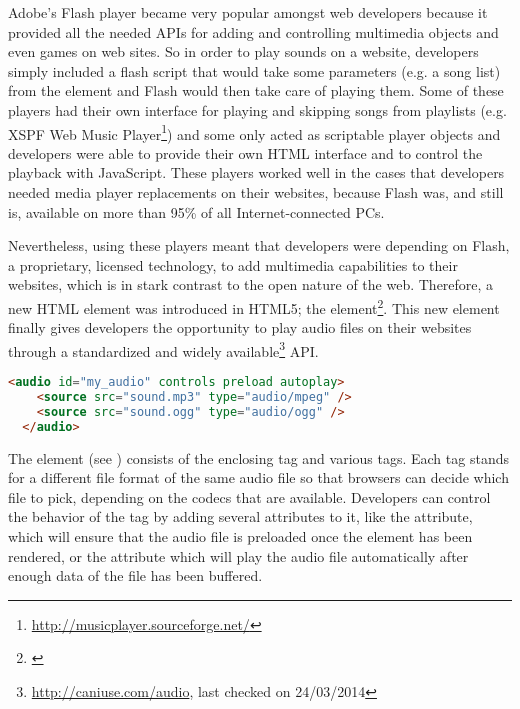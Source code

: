 Adobe's Flash player became very popular amongst web developers because it provided all the needed APIs for adding and controlling multimedia objects and even games on web sites. So in order to play sounds on a website, developers simply included a flash script that would take some parameters (e.g. a song list) from the  element and Flash would then take care of playing them. Some of these players had their own interface for playing and skipping songs from playlists (e.g. XSPF Web Music Player\footnote{\url{http://musicplayer.sourceforge.net/}}) and some only acted as scriptable player objects and developers were able to provide their own HTML interface and to control the playback with JavaScript. These players worked well in the cases that developers needed media player replacements on their websites, because Flash was, and still is, available on more than 95\% of all Internet-connected PCs. \cite{arah200999percent}

Nevertheless, using these players meant that developers were depending on Flash, a proprietary, licensed technology, to add multimedia capabilities to their websites, which is in stark contrast to the open nature of the web. Therefore, a new HTML element was introduced in HTML5; the  element\footnote{\cite[The audio element]{w32014html5}}. This new element finally gives developers the opportunity to play audio files on their websites through a standardized and widely available\footnote{\url{http://caniuse.com/audio}, last checked on 24/03/2014} API.

\begin{lstlisting}[language=HTML, caption=The HTML5 audio element, label=lst:audioelement]
  <audio id="my_audio" controls preload autoplay>
    <source src="sound.mp3" type="audio/mpeg" />
    <source src="sound.ogg" type="audio/ogg" />
  </audio>
\end{lstlisting}

The element (see ) consists of the enclosing  tag and various  tags. Each  tag stands for a different file format of the same audio file so that browsers can decide which file to pick, depending on the codecs that are available. Developers can control the behavior of the  tag by adding several attributes to it, like the  attribute, which will ensure that the audio file is preloaded once the element has been rendered, or the  attribute which will play the audio file automatically after enough data of the file has been buffered.

